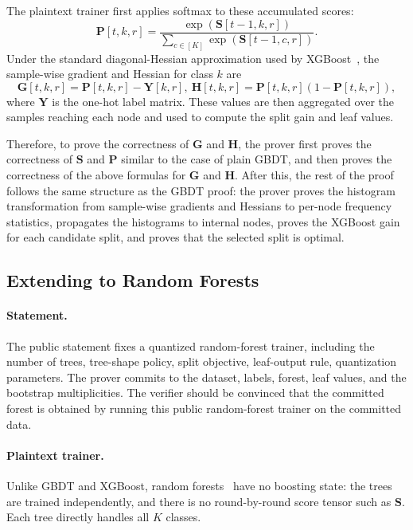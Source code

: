 The plaintext trainer first applies softmax to these accumulated scores:
\[
    \mathbf{P}[t,k,r]
    =
    \frac{\exp(\mathbf{S}[t-1,k,r])}
    {\sum_{c\in[K]}\exp(\mathbf{S}[t-1,c,r])}.
\]
Under the standard diagonal-Hessian approximation used by
XGBoost~\cite{xgboost16}, the sample-wise gradient and Hessian for class $k$
are
\[
    \mathbf{G}[t,k,r]=\mathbf{P}[t,k,r]-\mathbf{Y}[k,r],\ 
    \mathbf{H}[t,k,r]=\mathbf{P}[t,k,r](1-\mathbf{P}[t,k,r]),
\]
where $\mathbf{Y}$ is the one-hot label matrix. These values are then
aggregated over the samples reaching each node and used to compute the split
gain and leaf values.

Therefore, to prove the correctness of $\mathbf{G}$ and $\mathbf{H}$, the
prover first proves the correctness of $\mathbf{S}$ and $\mathbf{P}$
similar to the case of plain GBDT, and then proves the correctness of the above formulas for $\mathbf{G}$ and $\mathbf{H}$.
After this, the rest of the proof follows the same structure as the GBDT
proof: the prover proves the histogram transformation from sample-wise
gradients and Hessians to per-node frequency statistics, propagates the
histograms to internal nodes, proves the XGBoost gain for each candidate split,
and proves that the selected split is optimal.

\subsection{Extending to Random Forests~\cite{randomforsts01}}\label{app:rf-extension}

\paragraph{Statement.}
The public statement fixes a quantized random-forest trainer, including the
number of trees, tree-shape policy, split objective, leaf-output rule,
quantization parameters. The prover commits to the dataset, labels, forest, leaf values,
and the bootstrap multiplicities. The verifier should be convinced that the committed
forest is obtained by running this public random-forest trainer on the
committed data.

\paragraph{Plaintext trainer.}
Unlike GBDT and XGBoost, random forests~\cite{randomforsts01} have no boosting
state: the trees are trained independently, and there is no round-by-round score
tensor such as $\mathbf{S}$. Each tree directly handles all $K$ classes.

